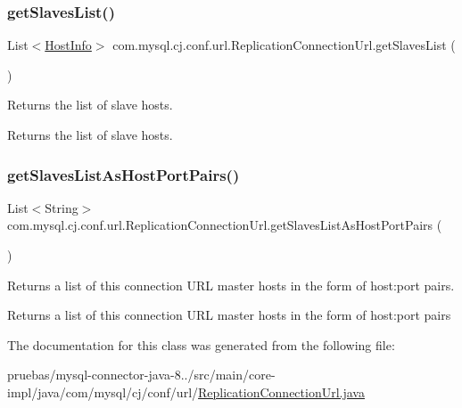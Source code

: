 \subsubsection{\texorpdfstring{get\+Slaves\+List()}{getSlavesList()}}
{\footnotesize\ttfamily List$<$\mbox{\hyperlink{classcom_1_1mysql_1_1cj_1_1conf_1_1_host_info}{Host\+Info}}$>$ com.\+mysql.\+cj.\+conf.\+url.\+Replication\+Connection\+Url.\+get\+Slaves\+List (\begin{DoxyParamCaption}{ }\end{DoxyParamCaption})}

Returns the list of slave hosts.

\begin{DoxyReturn}{Returns}
the list of slave hosts. 
\end{DoxyReturn}
\mbox{\label{classcom_1_1mysql_1_1cj_1_1conf_1_1url_1_1_replication_connection_url_aaf09eba8b7c2e3d417b6a9d4df7264a4}} 
\subsubsection{\texorpdfstring{get\+Slaves\+List\+As\+Host\+Port\+Pairs()}{getSlavesListAsHostPortPairs()}}
{\footnotesize\ttfamily List$<$String$>$ com.\+mysql.\+cj.\+conf.\+url.\+Replication\+Connection\+Url.\+get\+Slaves\+List\+As\+Host\+Port\+Pairs (\begin{DoxyParamCaption}{ }\end{DoxyParamCaption})}

Returns a list of this connection U\+RL master hosts in the form of host\+:port pairs.

\begin{DoxyReturn}{Returns}
a list of this connection U\+RL master hosts in the form of host\+:port pairs 
\end{DoxyReturn}


The documentation for this class was generated from the following file\+:\begin{DoxyCompactItemize}
\item 
pruebas/mysql-\/connector-\/java-\/8../src/main/core-\/impl/java/com/mysql/cj/conf/url/\mbox{\hyperlink{_replication_connection_url_8java}{Replication\+Connection\+Url.\+java}}\end{DoxyCompactItemize}
